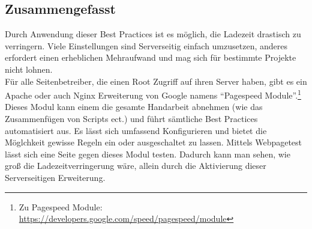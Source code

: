 	\subsection{Zusammengefasst} %
	\label{sub:zusammengefasst_entwicklung}
		Durch Anwendung dieser Best Practices ist es möglich, die Ladezeit drastisch zu verringern. Viele Einstellungen sind Serverseitig einfach umzusetzen, anderes erfordert einen erheblichen Mehraufwand und mag sich für bestimmte Projekte nicht lohnen.\\
		Für alle Seitenbetreiber, die einen Root Zugriff auf ihren Server haben, gibt es ein Apache oder auch Nginx Erweiterung von Google namens "`Pagespeed Module"'.\footnote{Zu Pagespeed Module: \url{https://developers.google.com/speed/pagespeed/module}} Dieses Modul kann einem die gesamte Handarbeit abnehmen (wie das Zusammenfügen von Scripts ect.) und führt sämtliche Best Practices automatisiert aus. Es lässt sich umfassend Konfigurieren und bietet die Möglchkeit gewisse Regeln ein oder ausgeschaltet zu lassen. Mittels Webpagetest lässt sich eine Seite gegen dieses Modul testen. Dadurch kann man sehen, wie groß die Ladezeitverringerung wäre, allein durch die Aktivierung dieser Serverseitigen Erweiterung.



